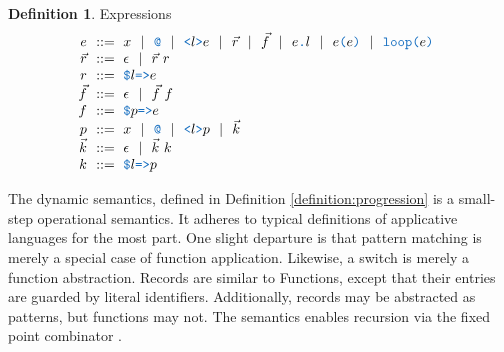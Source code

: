 \documentclass[acmsmall]{acmart}
\theoremstyle{definition}
\newtheorem{definition}{Definition}[section]
\begin{document}
\begin{definition} Expressions
  \label{definition:expressions}
  \[\begin{array}[t]{r@{}l}
    \nonterm{e} 
    & 
    \is 
    \begin{array}[t]{@{}l}
      x \sep 
      \obj{@} \sep
      \obj{<}l\obj{>}e \sep 
      \vec{r} \sep
      \vec{f} \sep 
      e\obj{.}l \sep
      e\obj{(}e\obj{)} \sep
      \obj{loop(}e\obj{)}
    \end{array}
    \\
    \nonterm{\vec{r}} & \is \epsilon \sep \vec{r}\ r 
    \\
    \nonterm{r} & \is \obj{\$}l\obj{=>}e
    \\
    \nonterm{\vec{f}} & \is \epsilon \sep \vec{f}\ f
    \\
    \nonterm{f} & \is \obj{\$}p\obj{=>}e
    \\
    \nonterm{p} & \is 
      x \sep
      \obj{@} \sep
      \obj{<}l\obj{>}p \sep
      \vec{k}
    \\
    \nonterm{\vec{k}} & \is \epsilon \sep \vec{k}\ k
    \\
    \nonterm{k} & \is \obj{\$}l\obj{=>}p
  \end{array}\]
\end{definition}

The dynamic semantics, defined in Definition \ref{definition:progression} is a small-step operational semantics.  
It adheres to typical definitions of applicative languages for the most part. One 
slight departure is that pattern matching is merely a special case of function application. 
Likewise, a switch is merely a function abstraction.
Records are similar to Functions, except that their entries are guarded by literal identifiers. 
Additionally, records may be abstracted as patterns, but functions may not.
The semantics enables recursion via the fixed point combinator .
\end{document}
